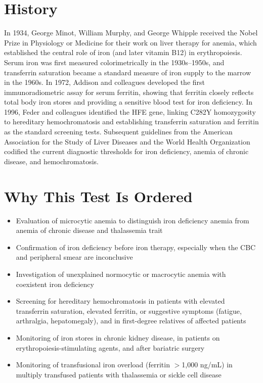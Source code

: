 \section*{History}
In 1934, George Minot, William Murphy, and George Whipple received the Nobel Prize in Physiology or Medicine for their work on liver therapy for anemia, which established the central role of iron (and later vitamin B12) in erythropoiesis. Serum iron was first measured colorimetrically in the 1930s--1950s, and transferrin saturation became a standard measure of iron supply to the marrow in the 1960s. In 1972, Addison and colleagues developed the first immunoradiometric assay for serum ferritin, showing that ferritin closely reflects total body iron stores and providing a sensitive blood test for iron deficiency. In 1996, Feder and colleagues identified the HFE gene, linking C282Y homozygosity to hereditary hemochromatosis and establishing transferrin saturation and ferritin as the standard screening tests. Subsequent guidelines from the American Association for the Study of Liver Diseases and the World Health Organization codified the current diagnostic thresholds for iron deficiency, anemia of chronic disease, and hemochromatosis.
\section*{Why This Test Is Ordered}
\begin{itemize}
  \item Evaluation of microcytic anemia to distinguish iron deficiency anemia from anemia of chronic disease and thalassemia trait
  \item Confirmation of iron deficiency before iron therapy, especially when the CBC and peripheral smear are inconclusive
  \item Investigation of unexplained normocytic or macrocytic anemia with coexistent iron deficiency
  \item Screening for hereditary hemochromatosis in patients with elevated transferrin saturation, elevated ferritin, or suggestive symptoms (fatigue, arthralgia, hepatomegaly), and in first-degree relatives of affected patients
  \item Monitoring of iron stores in chronic kidney disease, in patients on erythropoiesis-stimulating agents, and after bariatric surgery
  \item Monitoring of transfusional iron overload (ferritin $>$1,000 ng/mL) in multiply transfused patients with thalassemia or sickle cell disease
\end{itemize}
